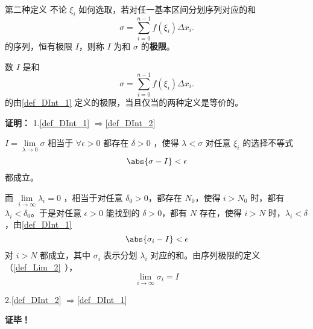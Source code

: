 \begin{definition}{第二种定义}
不论 $\xi_i$ 如何选取，若对任一基本区间分划序列对应的和 
\begin{equation}
\sigma=\sum_{i=0}^{n-1}f(\xi_i)\Delta x_i.
\end{equation}
的序列，恒有极限 $I$，则称 $I$ 为和 $\sigma$ 的\textbf{极限}。
\end{definition}
\begin{theorem}{}
数 $I$ 是和 
\begin{equation}
\sigma=\sum_{i=0}^{n-1}f(\xi_i)\Delta x_i.
\end{equation}
的由\autoref{def_DInt_1} 定义的极限，当且仅当的两种定义是等价的。
\end{theorem}
\textbf{证明：}
1.\autoref{def_DInt_1} $\Rightarrow$\autoref{def_DInt_2} 

$I=\lim\limits_{\lambda\rightarrow0}\sigma$ 相当于 $\forall\epsilon>0$ 都存在 $\delta>0$ ，使得 $\lambda<\sigma$ 对任意 $\xi_i$ 的选择不等式
\begin{equation}
\abs{\sigma-I}<\epsilon
\end{equation}
都成立。

而 $\lim\limits_{i\rightarrow\infty}\lambda_i=0$ ，相当于对任意 $\delta_0>0$，都存在 $N_0$，使得 $i>N_0$ 时，都有 $\lambda_i<\delta_0$。于是对任意 $\epsilon>0$ 能找到的 $\delta>0$，都有 $N$ 存在，使得 $i>N$ 时，$\lambda_i<\delta$，由\autoref{def_DInt_1} 
\begin{equation}
\abs{\sigma_i-I}<\epsilon
\end{equation}
对 $i>N$ 都成立，其中 $\sigma_i$ 表示分划 $\lambda_i$ 对应的和。由序列极限的定义（\autoref{def_Lim_2}~），
\begin{equation}
\lim_{i\rightarrow\infty} \sigma_i=I
\end{equation}

2.\autoref{def_DInt_2} $\Rightarrow$\autoref{def_DInt_1} 


\textbf{证毕！}